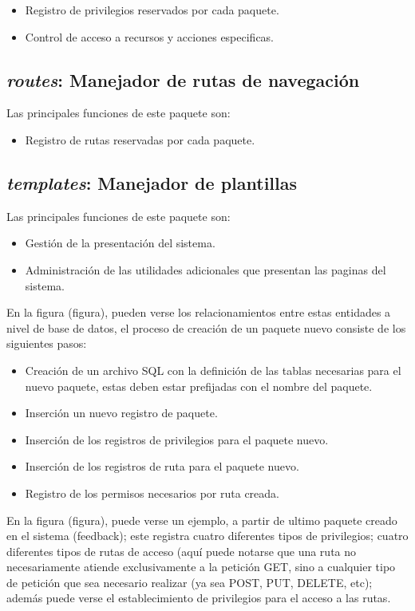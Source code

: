 \begin{itemize}
\item Registro de privilegios reservados por cada paquete.
\item Control de acceso a recursos y acciones especificas.
\end{itemize}

\subsection{\emph{routes}: Manejador de rutas de navegación}
Las principales funciones de este paquete son:

\begin{itemize}
\item Registro de rutas reservadas por cada paquete.
\end{itemize}

\subsection{\emph{templates}: Manejador de plantillas}
Las principales funciones de este paquete son:

\begin{itemize}
\item Gestión de la presentación del sistema.
\item Administración de las utilidades adicionales que presentan las paginas
del sistema.
\end{itemize}

En la figura (figura), pueden verse los relacionamientos entre estas entidades a
nivel de base de datos, el proceso de creación de un paquete nuevo consiste de
los siguientes pasos:

\begin{itemize}
\item Creación de un archivo SQL con la definición de las tablas necesarias para
el nuevo paquete, estas deben estar prefijadas con el nombre del paquete.
\item Inserción un nuevo registro de paquete.
\item Inserción de los registros de privilegios para el paquete nuevo.
\item Inserción de los registros de ruta para el paquete nuevo.
\item Registro de los permisos necesarios por ruta creada.
\end{itemize}

En la figura (figura), puede verse un ejemplo, a partir de ultimo paquete creado
en el sistema (feedback); este registra cuatro diferentes tipos de privilegios;
cuatro diferentes tipos de rutas de acceso (aquí puede notarse que una ruta no
necesariamente atiende exclusivamente a la petición GET, sino a cualquier tipo
de petición que sea necesario realizar (ya sea POST, PUT, DELETE, etc); además
puede verse el establecimiento de privilegios para el acceso a las rutas.

